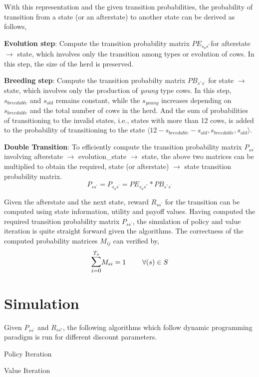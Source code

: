 \documentclass[a4paper,10pt]{report}
\newenvironment{my_itemize}{
\begin{itemize}
  \setlength{\itemsep}{1pt}
  \setlength{\parskip}{0pt}
  \setlength{\parsep}{0pt}}{
\end{itemize}}
\begin{document}
With this representation and the given transition probabilities, the probability of transition from a state (or an afterstate) to another state can be derived as follows,
\begin{my_itemize}
 \item \textbf{Evolution step}: Compute the transition probability matrix $PE_{s_{a}s^{''}}$for afterstate $\rightarrow$ state, which involves only the transition among types or evolution of cows.
 In this step, the size of the herd is preserved.
 \item \textbf{Breeding step}: Compute the transition probabilty matrix $PB_{s^{''}s^{'}}$ for state $\rightarrow$ state, which involves only the production of \emph{young} type cows.
 In this step, $s_{breedable}$ and  $s_{old}$ remains constant, while the $s_{young}$ increases depending on $s_{breedable}$ and the total number of cows in the herd.
 And the sum of probabilities of transitioning to the invalid states, i.e., states with more than 12 cows, 
 is added to the probability of transitioning to the state $\langle 12-s_{breedable}-s_{old},s_{breedable},s_{old}\rangle$.
 \item \textbf{Double Transition}: To efficiently compute the transition probability matrix $P_{ss^{'}}$ involving afterstate $\rightarrow$ evolution\_state $\rightarrow$ state,
 the above two matrices can be multiplied to obtain the required, state (or afterstate) $\rightarrow$ state transition probability matrix.
 \[ P_{ss^{'}} = P_{s_{a}s^{'}} = PE_{s_{a}s^{''}} * PB_{s^{''}s^{'}} \]
\end{my_itemize}

Given the afterstate and the next state, reward $R_{ss^{'}}$ for the transition can be computed using state information, utility and payoff values.
Having computed the required transition probability matrix $P_{ss^{'}}$, the simulation of policy and value iteration is quite straight forward given the algorithms.
The correctness of the computed probability matrices $M_{ij}$ can verified by,
\[ \mathlarger{\mathlarger{\sum}}_{i=0}^{T_{s}} M_{si} = 1\ \ \ \ \ \ \ \forall (s) \in S \]

\section{Simulation}

Given $P_{ss^{'}}$ and $R_{ss{'}}$, the following algorithms which follow dynamic programming paradigm is run for different discount parameters.
\begin{my_itemize}
 \item Policy Iteration
 \item Value Iteration
\end{my_itemize}
\end{document}
